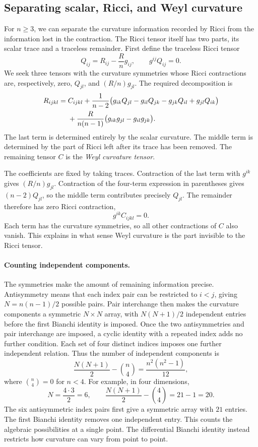 \documentclass[11pt,a4paper]{article}
\numberwithin{equation}{section}
\begin{document}
\subsection{Separating scalar, Ricci, and Weyl curvature}

For \(n\geq3\), we can separate the curvature information recorded
by Ricci from the information lost in the contraction. The Ricci tensor
itself has two parts, its scalar trace and a traceless remainder.
First define the traceless Ricci tensor
\begin{equation}
 Q_{ij}=R_{ij}-\frac{R}{n}g_{ij},
 \qquad g^{ij}Q_{ij}=0.
 \label{gr2:traceless-ricci}
\end{equation}
We seek three tensors with the curvature symmetries whose Ricci
contractions are, respectively, zero, \(Q_{jl}\), and \((R/n)g_{jl}\).
The required decomposition is
\begin{align}
 R_{ijkl}={}&C_{ijkl}
 +\frac{1}{n-2}\bigl(
       g_{ik}Q_{jl}-g_{il}Q_{jk}
       -g_{jk}Q_{il}+g_{jl}Q_{ik}\bigr)
 \notag\\
 &+\frac{R}{n(n-1)}
       \bigl(g_{ik}g_{jl}-g_{il}g_{jk}\bigr).
 \label{gr2:weyl-decomposition}
\end{align}
The last term is determined entirely by the scalar curvature. The
middle term is determined by the part of Ricci left after its trace
has been removed. The remaining tensor \(C\) is the \emph{Weyl
curvature tensor}.

The coefficients are fixed by taking traces. Contraction of the last
term with \(g^{ik}\) gives \((R/n)g_{jl}\). Contraction of the
four-term expression in parentheses gives \((n-2)Q_{jl}\), so the
middle term contributes precisely \(Q_{jl}\). The remainder therefore
has zero Ricci contraction,
\[
 g^{ik}C_{ijkl}=0.
\]
Each term has the curvature symmetries, so all other contractions of
\(C\) also vanish. This explains in what sense Weyl curvature is the
part invisible to the Ricci tensor.

\paragraph{Counting independent components.}
The symmetries make the amount of remaining information precise.
Antisymmetry means that each index pair can be restricted to
\(i<j\), giving \(N=n(n-1)/2\) possible pairs. Pair interchange
then makes the curvature components a symmetric \(N\times N\)
array, with \(N(N+1)/2\) independent entries before the first
Bianchi identity is imposed. Once the two antisymmetries and pair
interchange are imposed, a cyclic identity with a repeated index adds
no further condition. Each set of four distinct indices imposes one
further independent relation. Thus
the number of independent components is
\[
 \frac{N(N+1)}2-\binom n4
 =\frac{n^2(n^2-1)}{12},
\]
where \(\binom n4=0\) for \(n<4\). For example, in four dimensions,
\[
 N=\frac{4\cdot3}{2}=6,
 \qquad
 \frac{N(N+1)}2-\binom44=21-1=20.
\]
The six antisymmetric index pairs first give a symmetric array with
\(21\) entries. The first Bianchi identity removes one independent
entry. This counts the algebraic possibilities at a single point.
The differential Bianchi identity instead restricts how curvature can
vary from point to point.
\end{document}
